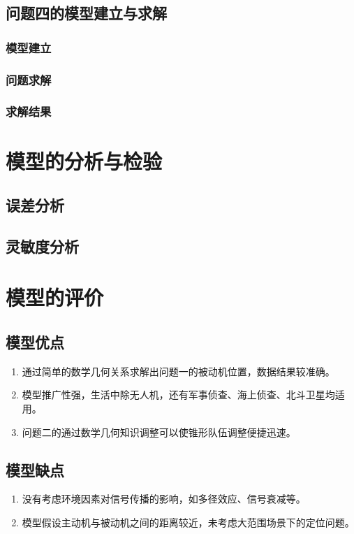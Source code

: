 \documentclass[withoutpreface,bwprint]{cumcmthesis} %
\begin{document}
\subsection{问题四的模型建立与求解}
\subsubsection{模型建立}
\subsubsection{问题求解}
\subsubsection{求解结果}

\section{模型的分析与检验}
\subsection{误差分析}
\subsection{灵敏度分析}


\section{模型的评价}
\subsection{模型优点}
\begin{enumerate}
    \item 通过简单的数学几何关系求解出问题一的被动机位置，数据结果较准确。
    \item 模型推广性强，生活中除无人机，还有军事侦查、海上侦查、北斗卫星均适用。
    \item 问题二的通过数学几何知识调整可以使锥形队伍调整便捷迅速。
\end{enumerate}

\subsection{模型缺点}
\begin{enumerate}
    \item 没有考虑环境因素对信号传播的影响，如多径效应、信号衰减等。
    \item 模型假设主动机与被动机之间的距离较近，未考虑大范围场景下的定位问题。
\end{enumerate}
\end{document}
